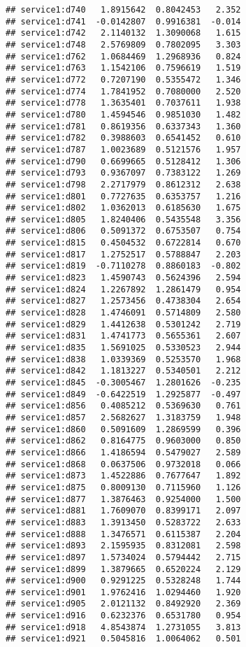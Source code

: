 \documentclass[
]{article}
\begin{document}
\begin{verbatim}
## service1:d740   1.8915642  0.8042453   2.352
## service1:d741  -0.0142807  0.9916381  -0.014
## service1:d742   2.1140132  1.3090068   1.615
## service1:d748   2.5769809  0.7802095   3.303
## service1:d762   1.0684469  1.2968936   0.824
## service1:d763   1.1542106  0.7596619   1.519
## service1:d772   0.7207190  0.5355472   1.346
## service1:d774   1.7841952  0.7080000   2.520
## service1:d778   1.3635401  0.7037611   1.938
## service1:d780   1.4594546  0.9851030   1.482
## service1:d781   0.8619356  0.6337343   1.360
## service1:d782   0.3988603  0.6541452   0.610
## service1:d787   1.0023689  0.5121576   1.957
## service1:d790   0.6699665  0.5128412   1.306
## service1:d793   0.9367097  0.7383122   1.269
## service1:d798   2.2717979  0.8612312   2.638
## service1:d801   0.7727635  0.6353757   1.216
## service1:d802   1.0362013  0.6185630   1.675
## service1:d805   1.8240406  0.5435548   3.356
## service1:d806   0.5091372  0.6753507   0.754
## service1:d815   0.4504532  0.6722814   0.670
## service1:d817   1.2752517  0.5788847   2.203
## service1:d819  -0.7110278  0.8860183  -0.802
## service1:d823   1.4590743  0.5624396   2.594
## service1:d824   1.2267892  1.2861479   0.954
## service1:d827   1.2573456  0.4738304   2.654
## service1:d828   1.4746091  0.5714809   2.580
## service1:d829   1.4412638  0.5301242   2.719
## service1:d831   1.4741773  0.5655361   2.607
## service1:d835   1.5691025  0.5330523   2.944
## service1:d838   1.0339369  0.5253570   1.968
## service1:d842   1.1813227  0.5340501   2.212
## service1:d845  -0.3005467  1.2801626  -0.235
## service1:d849  -0.6422519  1.2925877  -0.497
## service1:d856   0.4085212  0.5369630   0.761
## service1:d857   2.5682627  1.3183759   1.948
## service1:d860   0.5091609  1.2869599   0.396
## service1:d862   0.8164775  0.9603000   0.850
## service1:d866   1.4186594  0.5479027   2.589
## service1:d868   0.0637506  0.9732018   0.066
## service1:d873   1.4522886  0.7677647   1.892
## service1:d875   0.8009130  0.7115960   1.126
## service1:d877   1.3876463  0.9254000   1.500
## service1:d881   1.7609070  0.8399171   2.097
## service1:d883   1.3913450  0.5283722   2.633
## service1:d888   1.3476571  0.6115387   2.204
## service1:d893   2.1595935  0.8312081   2.598
## service1:d897   1.5734024  0.5794442   2.715
## service1:d899   1.3879665  0.6520224   2.129
## service1:d900   0.9291225  0.5328248   1.744
## service1:d901   1.9762416  1.0294460   1.920
## service1:d905   2.0121132  0.8492920   2.369
## service1:d916   0.6232376  0.6531780   0.954
## service1:d918   4.8543874  1.2731055   3.813
## service1:d921   0.5045816  1.0064062   0.501

\end{verbatim}
\end{document}
